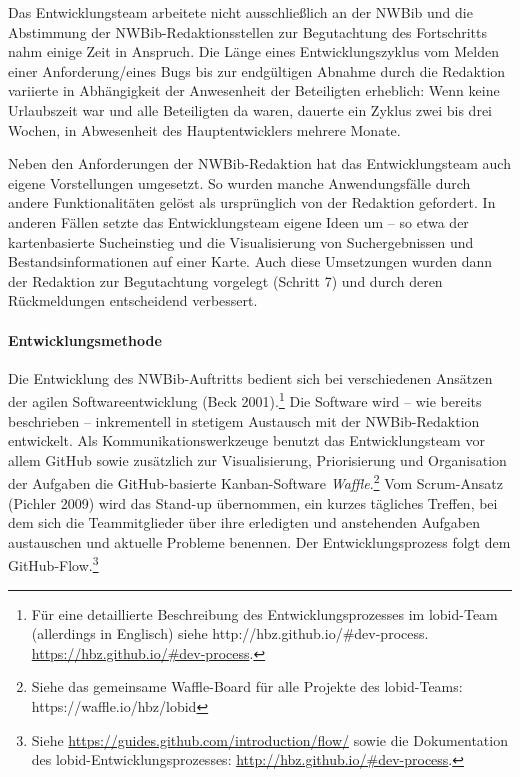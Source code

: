 \documentclass[a4paper,
fontsize=11pt,
oneside,
numbers=noperiodatend,
parskip=half-,
bibliography=totoc,
final
]{scrartcl}
\begin{document}
Das Entwicklungsteam arbeitete nicht ausschließlich an der NWBib und die
Abstimmung der NWBib-Redaktionsstellen zur Begutachtung des Fortschritts
nahm einige Zeit in Anspruch. Die Länge eines Entwicklungszyklus vom
Melden einer Anforderung/eines Bugs bis zur endgültigen Abnahme durch
die Redaktion variierte in Abhängigkeit der Anwesenheit der Beteiligten
erheblich: Wenn keine Urlaubszeit war und alle Beteiligten da waren,
dauerte ein Zyklus zwei bis drei Wochen, in Abwesenheit des
Hauptentwicklers mehrere Monate.

Neben den Anforderungen der NWBib-Redaktion hat das Entwicklungsteam
auch eigene Vorstellungen umgesetzt. So wurden manche Anwendungsfälle
durch andere Funktionalitäten gelöst als ursprünglich von der Redaktion
gefordert. In anderen Fällen setzte das Entwicklungsteam eigene Ideen um
-- so etwa der kartenbasierte Sucheinstieg und die Visualisierung von
Suchergebnissen und Bestandsinformationen auf einer Karte. Auch diese
Umsetzungen wurden dann der Redaktion zur Begutachtung vorgelegt
(Schritt 7) und durch deren Rückmeldungen entscheidend verbessert.

\paragraph{Entwicklungsmethode}\label{entwicklungsmethode}

Die Entwicklung des NWBib-Auftritts bedient sich bei verschiedenen
Ansätzen der agilen Softwareentwicklung (Beck 2001).\footnote{Für eine
  detaillierte Beschreibung des Entwicklungsprozesses im lobid-Team
  (allerdings in Englisch) siehe http://hbz.github.io/\#dev-process.
  \url{https://hbz.github.io/\#dev-process}.} Die Software wird -- wie
bereits beschrieben -- inkrementell in stetigem Austausch mit der
NWBib-Redaktion entwickelt. Als Kommunikationswerkzeuge benutzt das
Entwicklungsteam vor allem GitHub sowie zusätzlich zur Visualisierung,
Priorisierung und Organisation der Aufgaben die GitHub-basierte
Kanban-Soft\-ware \emph{Waffle}.\footnote{Siehe das gemeinsame
  Waffle-Board für alle Projekte des lobid-Teams:
  https://waffle.io/hbz/lobid} Vom Scrum-Ansatz (Pichler 2009) wird das
Stand-up übernommen, ein kurzes tägliches Treffen, bei dem sich die
Teammitglieder über ihre erledigten und anstehenden Aufgaben austauschen
und aktuelle Probleme benennen. Der Entwicklungsprozess folgt dem
GitHub-Flow.\footnote{Siehe
  \url{https://guides.github.com/introduction/flow/} sowie die
  Dokumentation des lobid-Entwicklungsprozesses:
  \url{http://hbz.github.io/\#dev-process}.}
\end{document}

